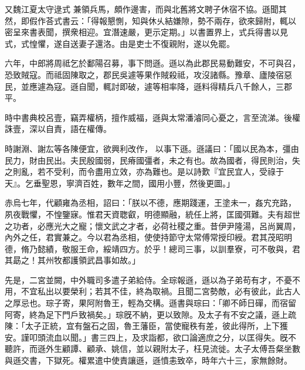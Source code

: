 \begin{pinyinscope}
 
又魏江夏太守逯式
 兼領兵馬，頗作邊害，而與北舊將文聘子休宿不協。遜聞其然，即假作荅式書云：「得報懇惻，知與休乆結嫌隙，勢不兩存，欲來歸附，輒以密呈來書表聞，撰衆相迎。宜潛速嚴，更示定期。」以書置界上，式兵得書以見式，式惶懼，遂自送妻子還洛。由是吏士不復親附，遂以免罷。
 
 
 
 
 六年，中郎將周祗乞於鄱陽召募，事下問遜。遜以為此郡民易動難安，不可與召，恐致賊寇。而祗固陳取之，郡民吳遽等果作賊殺祗，攻沒諸縣。豫章、廬陵宿惡民，並應遽為寇。遜自聞，輒討即破，遽等相率降，遜料得精兵八千餘人，三郡平。
 
 
 
 
 時中書典校呂壹，竊弄權柄，擅作威福，遜與太常潘濬同心憂之，言至流涕。後權誅壹，深以自責，語在權傳。
 
 
時謝淵、謝厷等各陳便宜，欲興利改作，
 以事下遜。遜議曰：「國以民為本，彊由民力，財由民出。夫民殷國弱，民瘠國彊者，未之有也。故為國者，得民則治，失之則亂，若不受利，而令盡用立效，亦為難也。是以詩歎『宜民宜人，受祿于天』。乞垂聖恩，寧濟百姓，數年之間，國用小豐，然後更圖。」
 
 
 
 
 赤烏七年，代顧雍為丞相，詔曰：「朕以不德，應期踐運，王塗未一，姦宄充路，夙夜戰懼，不惶鑒寐。惟君天資聦叡，明德顯融，統任上將，匡國弭難。夫有超世之功者，必應光大之寵；懷文武之才者，必荷社稷之重。昔伊尹隆湯，呂尚翼周，內外之任，君實兼之。今以君為丞相，使使持節守太常傅常授印綬。君其茂昭明德，脩乃懿績，敬服王命，綏靖四方。於乎！總司三事，以訓羣寮，可不敬與，君其勗之！其州牧都護領武昌事如故。」
 
 
 
 
 先是，二宮並闕，中外職司多遣子弟給侍。全琮報遜，遜以為子弟苟有才，不憂不用，不宜私出以要榮利；若其不佳，終為取禍。且聞二宮勢敵，必有彼此，此古人之厚忌也。琮子寄，果阿附魯王，輕為交構。遜書與琮曰：「卿不師日磾，而宿留阿寄，終為足下門戶致禍矣。」琮旣不納，更以致隙。及太子有不安之議，遜上疏陳：「太子正統，宜有盤石之固，魯王藩臣，當使寵秩有差，彼此得所，上下獲安。謹叩頭流血以聞。」書三四上，及求詣都，欲口論適庶之分，以匡得失。旣不聽許，而遜外生顧譚、顧承、姚信，並以親附太子，枉見流徙。太子太傅吾粲坐數與遜交書，下獄死。權累遣中使責讓遜，遜憤恚致卒，時年六十三，家無餘財。
 

\end{pinyinscope}
